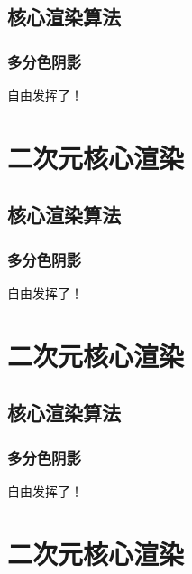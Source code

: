 \documentclass[twoside, 11pt, a4paper]{article}
\numberwithin{equation}{section} %
\begin{document}
\subsection{核心渲染算法}

\subsubsection{多分色阴影}

{%
自由发挥了！
}



\newpage

\section{二次元核心渲染}

\subsection{核心渲染算法}

\subsubsection{多分色阴影}

{%
自由发挥了！
}



\newpage

\section{二次元核心渲染}

\subsection{核心渲染算法}

\subsubsection{多分色阴影}

{%
自由发挥了！
}


\newpage

\section{二次元核心渲染}
\end{document}
